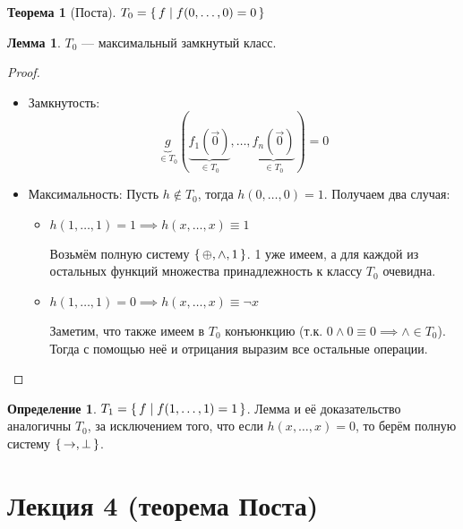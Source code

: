 \documentclass[12pt]{article}
\let\im\rightarrow
\let\eq\equiv
\let\la\land
\let\n\neg
\let\nin\notin
\theoremstyle{definition}
\newtheorem{definition}{Определение}[section]
\newtheorem{theorem}{Теорема}[section]
\theoremstyle{statement}
\theoremstyle{theorem}
\newtheorem{lemma}{Лемма}[section]
\begin{document}
\begin{theorem}[Поста]
  $T_0 = \set{f \mid f(0, \ldots, 0) = 0}$
  \begin{lemma}
    $T_0$ --- максимальный замкнутый класс.
    \begin{proof}
      \begin{itemize}
        \item Замкнутость:
          \begin{displaymath}
            \underbrace{g}_{\in T_0}(\underbrace{f_1(\vec{0})}_{\in
              T_0}, \ldots,
            \underbrace{f_n(\vec{0})}_{\in T_0}) = 0
          \end{displaymath}

        \item Максимальность:
          Пусть $h \nin T_0$, тогда $h(0, \ldots, 0) = 1$. Получаем два случая:
          \begin{itemize}
            \item $h(1, \ldots, 1) = 1 \implies h(x, \ldots, x) \eq 1$

              Возьмём полную систему $\set{\oplus, \la, 1}$. 1 уже имеем, а для
              каждой из остальных функций множества принадлежность к
              классу $T_0$ очевидна.

            \item $h(1, \ldots, 1) = 0 \implies h(x, \ldots, x) \eq \n x$

              Заметим, что также имеем в $T_0$ конъюнкцию (т.к. $0
              \land 0 \eq 0 \implies \land \in T_0$). Тогда с помощью
              неё и отрицания выразим все остальные операции.
          \end{itemize}

      \end{itemize}
    \end{proof}
  \end{lemma}

  \begin{definition}
    $T_1 = \set{f \mid f(1, \ldots, 1) = 1}$. Лемма и её
    доказательство аналогичны $T_0$, за исключением того, что если
    $h(x, \dots, x) = 0$, то берём полную систему $\set{\im, \perp}$.
  \end{definition}
\end{theorem}

\pagebreak

\section{Лекция 4 (теорема Поста)}
\end{document}
